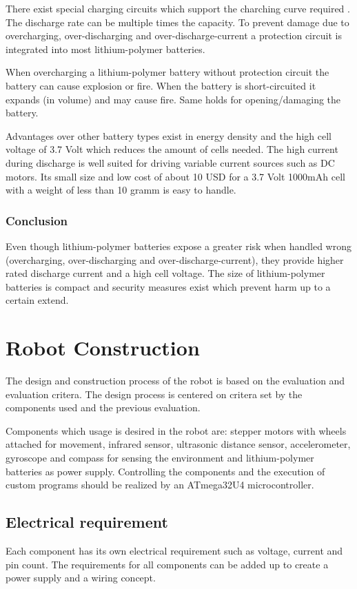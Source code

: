 \documentclass[11pt,a4paper]{article}
\begin{document}
There exist special charging circuits which support the charching curve required . The discharge rate can be multiple times the capacity.
To prevent damage due to overcharging, over-discharging and over-discharge-current a protection circuit is integrated into most lithium-polymer batteries.

When overcharging a lithium-polymer battery without protection circuit the battery can cause explosion or fire. When the battery is short-circuited it expands (in volume) and may cause fire. Same holds for opening/damaging the battery. 

Advantages over other battery types exist in energy density and the high cell voltage of 3.7 Volt which reduces the amount of cells needed. The high current during discharge is well suited for driving variable current sources such as DC motors. Its small size and low cost of about 10 USD for a 3.7 Volt 1000mAh cell with a weight of less than 10 gramm is easy to handle.
\subsubsection{Conclusion}
Even though lithium-polymer batteries expose a greater risk when handled wrong (overcharging, over-discharging and over-discharge-current), they provide higher rated discharge current and a high cell voltage. The size of lithium-polymer batteries is compact and security measures  exist which prevent harm up to a certain extend.
\section{Robot Construction}
The design and construction process of the robot is based on the evaluation and evaluation critera. The design process is centered on critera set by the components used and the previous evaluation. 

Components which usage is desired in the robot are: stepper motors with wheels attached for movement, infrared sensor, ultrasonic distance sensor, accelerometer, gyroscope and compass for sensing the environment and lithium-polymer batteries as power supply. Controlling the components and the execution of custom programs should be realized by an ATmega32U4 microcontroller.

\subsection{Electrical requirement}
Each component has its own electrical requirement such as voltage, current and pin count. The requirements for all components can be added up to create a power supply and a wiring concept. 
\end{document}
